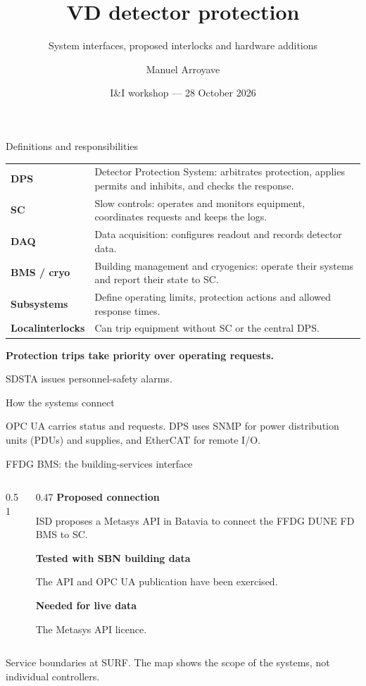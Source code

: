 \documentclass[aspectratio=169,11pt]{beamer}
\title{VD detector protection}
\subtitle{System interfaces, proposed interlocks and hardware additions}
\author{Manuel Arroyave}
\date{I\&I workshop --- 28 October 2026}
\newcommand{\captionline}[1]{\par{\small\color{DuneTextMuted}#1\par}}
\begin{document}
\begin{frame}{Definitions and responsibilities}
\renewcommand{\arraystretch}{1.18}
\begin{tabularx}{\textwidth}{@{}>{\RaggedRight\arraybackslash}p{2.2cm}>{\RaggedRight\arraybackslash}X@{}}
\textbf{DPS} & Detector Protection System: arbitrates protection, applies permits and inhibits, and checks the response.\\
\textbf{SC} & Slow controls: operates and monitors equipment, coordinates requests and keeps the logs.\\
\textbf{DAQ} & Data acquisition: configures readout and records detector data.\\
\textbf{BMS / cryo} & Building management and cryogenics: operate their systems and report their state to SC.\\
\textbf{Subsystems} & Define operating limits, protection actions and allowed response times.\\
\textbf{Local\newline interlocks} & Can trip equipment without SC or the central DPS.\\
\end{tabularx}\par\bigskip
\textbf{Protection trips take priority over operating requests.}\par\medskip
SDSTA issues personnel-safety alarms.
\end{frame}

\begin{frame}{How the systems connect}
\centering
{}\par\bigskip
\raggedright

OPC UA carries status and requests. DPS uses SNMP for power distribution units (PDUs) and supplies, and EtherCAT for remote I/O.
\end{frame}

\begin{frame}{FFDG BMS: the building-services interface}
\begin{columns}[T,onlytextwidth]
\begin{column}{0.51\textwidth}
\centering{}
\end{column}
\begin{column}{0.47\textwidth}
\textbf{Proposed connection}\par
ISD proposes a Metasys API in Batavia to connect the FFDG DUNE FD BMS to SC.\par\bigskip
\textbf{Tested with SBN building data}\par
The API and OPC UA publication have been exercised.\par\bigskip
\textbf{Needed for live data}\par
The Metasys API licence.
\end{column}
\end{columns}\par\bigskip
\captionline{Service boundaries at SURF. The map shows the scope of the systems, not individual controllers.}
\end{frame}
\end{document}

